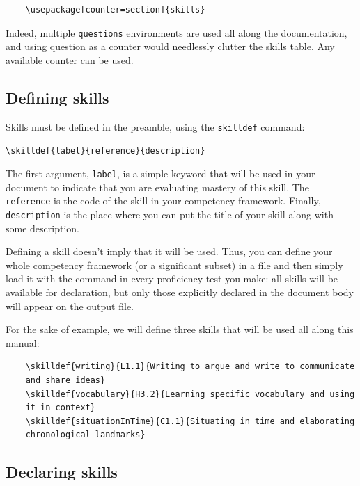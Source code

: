 \documentclass[12pt]{exam}
\begin{document}
\begin{verbatim}
	\usepackage[counter=section]{skills}
\end{verbatim}

Indeed, multiple \verb|questions| environments are used all along the documentation, and using question as a counter would needlessly clutter the skills table. Any available counter can be used.
\subsection{Defining skills}
\label{sec:UsageDefiningSkills}

Skills must be defined in the preamble, using the \verb|skilldef| command:
\begin{center}
	\verb|\skilldef{label}{reference}{description}|
\end{center}

The first argument, \verb|label|, is a simple keyword that will be used in your document
to indicate that you are evaluating mastery of this skill. The \verb|reference|
is the code of the skill in your competency framework. Finally, \verb|description| is the
place where you can put the title of your skill along with some description.

Defining a skill doesn't imply that it will be used. Thus, you can define your whole
competency framework (or a significant subset) in a file and then simply load it
with the \verb|| command in every proficiency test you make: all skills will
be available for declaration, but only those explicitly declared in the document body
will appear on the output file.

For the sake of example, we will define three skills that will be used all along this
manual:

\begin{verbatim}
	\skilldef{writing}{L1.1}{Writing to argue and write to communicate
	and share ideas}
	\skilldef{vocabulary}{H3.2}{Learning specific vocabulary and using
	it in context}
	\skilldef{situationInTime}{C1.1}{Situating in time and elaborating
	chronological landmarks}
\end{verbatim}

\subsection{Declaring skills}
\label{sec:UsageDeclaringSkills}
\end{document}
